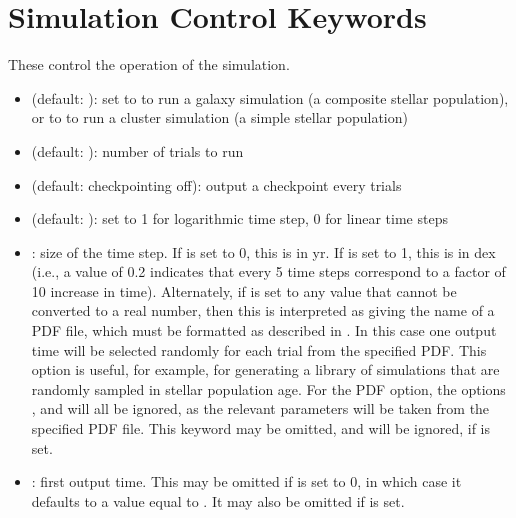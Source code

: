 \documentclass[letterpaper,10pt,english]{sphinxmanual}
\begin{document}
\section{Simulation Control Keywords}
\label{\detokenize{parameters:simulation-control-keywords}}
These control the operation of the simulation.
\begin{itemize}
\item {} 
 (default: ): set to  to run a galaxy simulation (a composite stellar population), or to  to run a cluster simulation (a simple stellar population)

\item {} 
 (default: ): number of trials to run

\item {} 
 (default: checkpointing off): output a checkpoint every  trials

\item {} 
 (default: ): set to 1 for logarithmic time step, 0 for linear time steps

\item {} 
: size of the time step. If  is set to 0, this is in yr. If  is set to 1, this is in dex (i.e., a value of 0.2 indicates that every 5 time steps correspond to a factor of 10 increase in time). Alternately, if  is set to any value that cannot be converted to a real number, then this is interpreted as giving the name of a PDF file, which must be formatted as described in {\hyperref[\detokenize{pdfs:sec-pdfs}]{}}. In this case one output time will be selected randomly for each trial from the specified PDF. This option is useful, for example, for generating a library of simulations that are randomly sampled in stellar population age. For the PDF option, the options ,  and  will all be ignored, as the relevant parameters will be taken from the specified PDF file. This keyword may be omitted, and will be ignored, if  is set.

\item {} 
: first output time. This may be omitted if  is set to 0, in which case it defaults to a value equal to . It may also be omitted if  is set.


\end{itemize}
\end{document}
